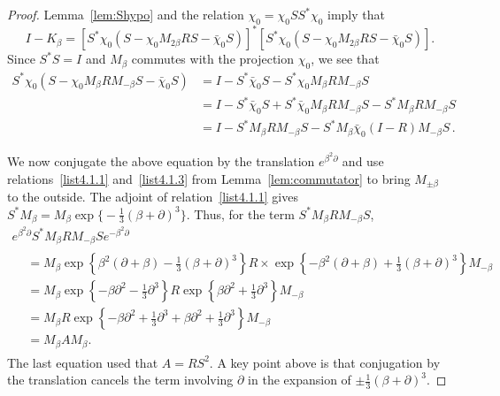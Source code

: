 \documentclass[10pt]{amsart}
\theoremstyle{definition}\newtheorem{defi}[theo]{Definition}\newtheorem{rema}[theo]{Remark}\newtheorem{exam}[theo]{Example}\newtheorem{exem}[theo]{Example}\newtheorem{nota}[theo]{Notation}
\begin{document}
\begin{proof}
Lemma~\ref{lem:Shypo} and the relation $\chi_0 = \chi_0 S S^{*} \chi_0$ imply that
\begin{equation}\label{eqn:factor}
I - K_{\beta} = \left [S^{*}\chi_0(S- \chi_0 M_{2\beta}RS - \bar{\chi}_0 S) \right]^{*}
\left [S^{*}\chi_0(S- \chi_0 M_{2\beta}RS - \bar{\chi}_0 S)\right].
\end{equation}
Since $S^{*}S = I$ and $M_{\beta}$ commutes with the projection $\chi_0$, we see that
\begin{align*}
S^{*}\chi_0(S- \chi_0 M_{\beta}RM_{-\beta}S - \bar{\chi}_0 S) &= I - S^{*}\bar{\chi}_0 S - S^{*} \chi_0 M_{\beta}RM_{-\beta}S \\
&= I - S^{*}\bar{\chi}_0 S + S^{*} \bar{\chi}_0 M_{\beta} R M_{-\beta} S - S^{*} M_{\beta} R M_{-\beta} S \\
& = I - S^{*} M_{\beta} R M_{-\beta} S - S^{*}M_{\beta}\bar{\chi}_0(I - R)M_{-\beta}S\,.
\end{align*}

We now conjugate the above equation by the translation $e^{\beta^2 \partial}$ and use relations~\eqref{list4.1.1} and~\eqref{list4.1.3} from Lemma~\ref{lem:commutator} to bring $M_{\pm \beta}$ to the outside. The adjoint of relation~\eqref{list4.1.1} gives $S^{*}M_{\beta} = M_{\beta} \exp \big \{ -\frac{1}{3} (\beta + \partial)^3 \big \}$. Thus, for the term $S^{*} M_{\beta} R M_{-\beta} S$,
\begin{multline*}
e^{\beta^2 \partial} S^{*} M_{\beta} R M_{-\beta} S e^{-\beta^2 \partial}\\
\begin{aligned}
&=M_{\beta} \exp \left \{ \beta^2(\partial+\beta) - \frac{1}{3} (\beta + \partial)^3 \right \} R \times \exp \left \{ -\beta^2(\partial+\beta) + \frac{1}{3} (\beta + \partial)^3 \right \} M_{-\beta} \\
& = M_{\beta} \exp \left \{ -\beta \partial^2 - \frac{1}{3} \partial^3 \right \} R
\exp \left \{ \beta \partial^2 + \frac{1}{3} \partial^3 \right \} M_{-\beta} \\
& = M_{\beta} R \exp \left \{ -\beta \partial^2 + \frac{1}{3} \partial^3 + \beta \partial^2 + \frac{1}{3} \partial^3\right \} M_{-\beta} \\
& = M_{\beta} A M_{\beta}.
\end{aligned}
\end{multline*}
The last equation used that $A = RS^2$. A key point above is that conjugation by the translation cancels the term involving $\partial$ in the expansion of $\pm \frac{1}{3}(\beta + \partial)^{3}$.


\end{proof}
\end{document}
